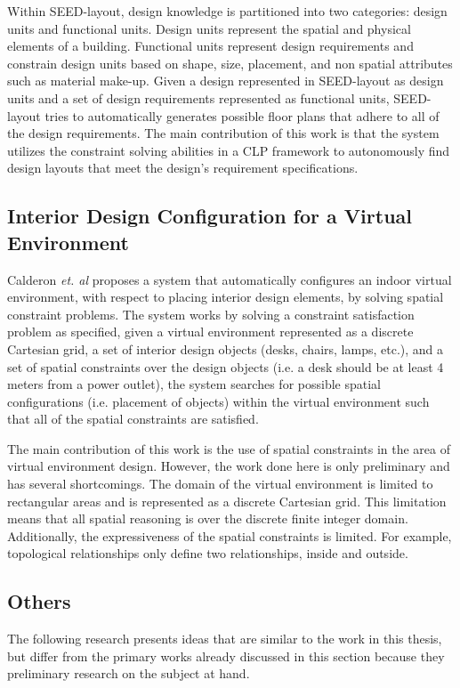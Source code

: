 \documentclass[12pt]{ucthesis}
\begin{document}
Within SEED-layout, design knowledge is partitioned into two categories: design units and functional units. Design units represent the spatial and physical elements of a building. Functional units represent design requirements and constrain design units based on shape, size, placement, and non spatial attributes such as material make-up. Given a design represented in SEED-layout as design units and a set of design requirements represented as functional units, SEED-layout tries to automatically generates possible floor plans that adhere to all of the design requirements. The main contribution of this work is that the system utilizes the constraint solving abilities in a CLP framework to autonomously find design layouts that meet the design's requirement specifications.


\subsection{Interior Design Configuration for a Virtual Environment}
Calderon \emph{et. al} proposes a system that automatically configures an indoor virtual environment, with respect to placing interior design elements, by solving spatial constraint problems. The system works by solving a constraint satisfaction problem as specified, given a virtual environment represented as a discrete Cartesian grid, a set of interior design objects (desks, chairs, lamps, etc.), and a set of spatial constraints over the design objects (i.e. a desk should be at least 4 meters from a power outlet), the system searches for possible spatial configurations (i.e. placement of objects) within the virtual environment such that all of the spatial constraints are satisfied. 

The main contribution of this work is the use of spatial constraints in the area of virtual environment design. However, the work done here is only preliminary and has several shortcomings. The domain of the virtual environment is limited to rectangular areas and is represented as a discrete Cartesian grid. This limitation means that all spatial reasoning is over the discrete finite integer domain. Additionally, the expressiveness of the spatial constraints is limited. For example, topological relationships only define two relationships, inside and outside. 

\subsection{Others}
The following research presents ideas that are similar to the work in this thesis, but differ from the primary works already discussed in this section because they preliminary research on the subject at hand.
\end{document}
